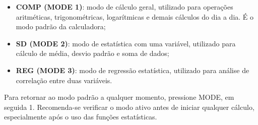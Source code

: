 \begin{itemize}
    \item \textbf{COMP (MODE 1)}: modo de cálculo geral, utilizado para 
    operações aritméticas, trigonométricas, logarítmicas e demais cálculos 
    do dia a dia. É o modo padrão da calculadora;
    \item \textbf{SD (MODE 2)}: modo de estatística com uma variável, 
    utilizado para cálculo de média, desvio padrão e soma de dados;
    \item \textbf{REG (MODE 3)}: modo de regressão estatística, utilizado 
    para análise de correlação entre duas variáveis.
\end{itemize}

Para retornar ao modo padrão a qualquer momento, pressione MODE, em seguida 1. Recomenda-se verificar o modo ativo antes de iniciar qualquer cálculo, especialmente após o uso das funções estatísticas.
